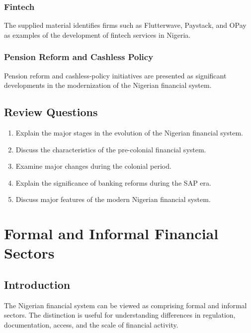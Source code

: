 \documentclass[
]{article}
\providecommand{\tightlist}{%
  \setlength{\itemsep}{0pt}\setlength{\parskip}{0pt}}
\begin{document}
\subsubsection{Fintech}\label{fintech}

The supplied material identifies firms such as Flutterwave, Paystack, and OPay as examples of the development of fintech services in Nigeria.

\subsubsection{Pension Reform and Cashless Policy}\label{pension-reform-and-cashless-policy}

Pension reform and cashless-policy initiatives are presented as significant developments in the modernization of the Nigerian financial system.

\subsection{Review Questions}\label{review-questions}

\begin{enumerate}
\def\labelenumi{\arabic{enumi}.}
\tightlist
\item
  Explain the major stages in the evolution of the Nigerian financial system.
\item
  Discuss the characteristics of the pre-colonial financial system.
\item
  Examine major changes during the colonial period.
\item
  Explain the significance of banking reforms during the SAP era.
\item
  Discuss major features of the modern Nigerian financial system.
\end{enumerate}

\section{Formal and Informal Financial Sectors}\label{formal-and-informal-financial-sectors}

\subsection{Introduction}\label{introduction-2}

The Nigerian financial system can be viewed as comprising formal and informal sectors. The distinction is useful for understanding differences in regulation, documentation, access, and the scale of financial activity.
\end{document}
